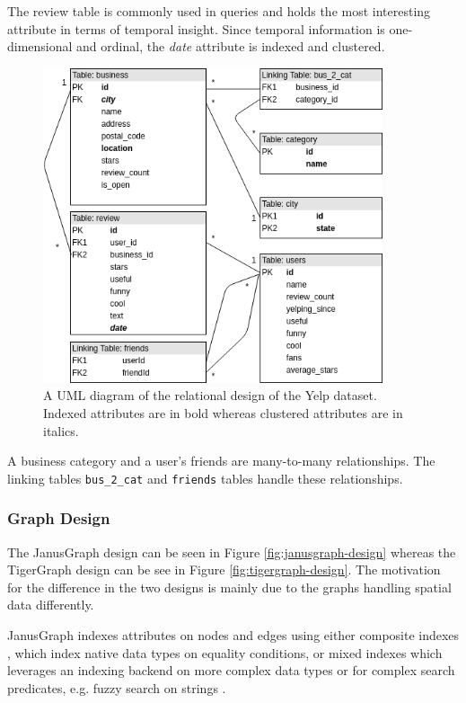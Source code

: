 The review table is commonly used in queries and holds the most interesting attribute in terms of temporal insight. Since temporal information is one-dimensional and ordinal, the \emph{date} attribute is indexed and clustered.

\begin{figure}[h!]
    \centering
    \includegraphics[width=10cm]{img/relational-design.png}
    \caption{A UML diagram of the relational design of the Yelp dataset. Indexed attributes are in bold whereas clustered attributes are in italics.}
    \label{fig:relational-design}
\end{figure}

A business category and a user's friends are many-to-many relationships. The linking tables \texttt{bus\_2\_cat} and \texttt{friends} tables handle these relationships.

\subsubsection{Graph Design}

The JanusGraph design can be seen in Figure \ref{fig:janusgraph-design} whereas the TigerGraph design can be see in Figure \ref{fig:tigergraph-design}. The motivation for the difference in the two designs is mainly due to the graphs handling spatial data differently.

JanusGraph indexes attributes on nodes and edges using either composite indexes \cite{janusgraph-comp-index}, which index native data types on equality conditions, or mixed indexes which leverages an indexing backend on more complex data types or for complex search predicates, e.g. fuzzy search on strings \cite{janusgraph-mixed-index}.

